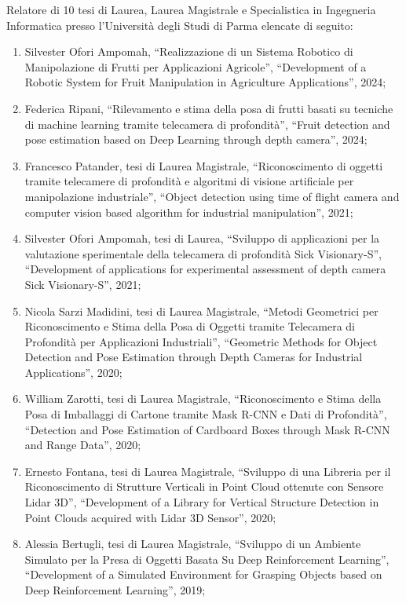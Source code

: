 \documentclass[11pt]{article}
\begin{document}
Relatore di 10 tesi di Laurea, Laurea Magistrale e Specialistica in Ingegneria Informatica presso l'Universit\`a degli Studi di Parma elencate di seguito: 
\begin{enumerate}
\item Silvester Ofori Ampomah, ``Realizzazione di un Sistema Robotico di Manipolazione di Frutti per Applicazioni Agricole'', 
  ``Development of a Robotic System for Fruit Manipulation in Agriculture Applications'', 2024; 
%
\item Federica Ripani, ``Rilevamento e stima della posa di frutti basati su tecniche di machine learning tramite telecamera di profondit\`a'', 
  ``Fruit detection and pose estimation based on Deep Learning through depth camera'', 2024; 
%
\item Francesco Patander, tesi di Laurea Magistrale, ``Riconoscimento di oggetti tramite telecamere di profondità e algoritmi di visione artificiale per manipolazione industriale'', 
   ``Object detection using time of flight camera and computer vision based algorithm for industrial manipulation'', 2021;
\item Silvester Ofori Ampomah, tesi di Laurea, ``Sviluppo di applicazioni per la valutazione sperimentale della telecamera di profondità Sick Visionary-S'',
``Development of applications for experimental assessment of depth camera Sick Visionary-S'', 2021; 
\item Nicola Sarzi Madidini, tesi di Laurea Magistrale, ``Metodi Geometrici per Riconoscimento e Stima della Posa di Oggetti tramite Telecamera di Profondità per Applicazioni Industriali'', 
   ``Geometric Methods for Object Detection and Pose Estimation through Depth Cameras for Industrial Applications'', 2020;
\item William Zarotti, tesi di Laurea Magistrale, ``Riconoscimento e Stima della Posa di Imballaggi di Cartone tramite Mask R-CNN e Dati di Profondità'', 
   ``Detection and Pose Estimation of Cardboard Boxes through Mask R-CNN and Range Data'', 2020;
\item Ernesto Fontana, tesi di Laurea Magistrale, ``Sviluppo di una Libreria per il Riconoscimento di Strutture Verticali in Point Cloud ottenute con Sensore Lidar 3D'', 
   ``Development of a Library for Vertical Structure Detection in Point Clouds acquired with Lidar 3D Sensor'', 2020;
\item Alessia Bertugli, tesi di Laurea Magistrale, ``Sviluppo di un Ambiente Simulato per la Presa di Oggetti Basata Su Deep Reinforcement Learning'', 
   ``Development of a Simulated Environment for Grasping Objects based on Deep Reinforcement Learning'', 2019;

\end{enumerate}
\end{document}
